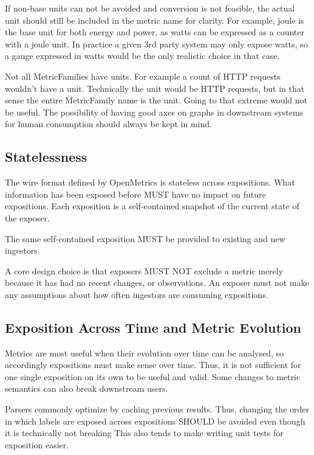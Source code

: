 \documentclass[a4paper,12pt,notitlepage,twoside,openright]{article}
\begin{document}
If non-base units can not be avoided and conversion is not feasible, the
actual unit should still be included in the metric name for clarity. For
example, joule is the base unit for both energy and power, as watts can
be expressed as a counter with a joule unit. In practice a given 3rd
party system may only expose watts, so a gauge expressed in watts would
be the only realistic choice in that case.

Not all MetricFamilies have units. For example a count of HTTP requests
wouldn't have a unit. Technically the unit would be HTTP requests, but
in that sense the entire MetricFamily name is the unit. Going to that
extreme would not be useful. The possibility of having good axes on
graphs in downstream systems for human consumption should always be kept
in mind.

\hypertarget{statelessness}{%
\subsection{Statelessness}\label{statelessness}}

The wire format defined by OpenMetrics is stateless across expositions.
What information has been exposed before MUST have no impact on future
expositions. Each exposition is a self-contained snapshot of the current
state of the exposer.

The same self-contained exposition MUST be provided to existing and new
ingestors.

A core design choice is that exposers MUST NOT exclude a metric merely
because it has had no recent changes, or observations. An exposer must
not make any assumptions about how often ingestors are consuming
expositions.

\hypertarget{exposition-across-time-and-metric-evolution}{%
\subsection{Exposition Across Time and Metric
Evolution}\label{exposition-across-time-and-metric-evolution}}

Metrics are most useful when their evolution over time can be analysed,
so accordingly expositions must make sense over time. Thus, it is not
sufficient for one single exposition on its own to be useful and valid.
Some changes to metric semantics can also break downstream users.

Parsers commonly optimize by caching previous results. Thus, changing
the order in which labels are exposed across expositions SHOULD be
avoided even though it is technically not breaking This also tends to
make writing unit tests for exposition easier.
\end{document}
